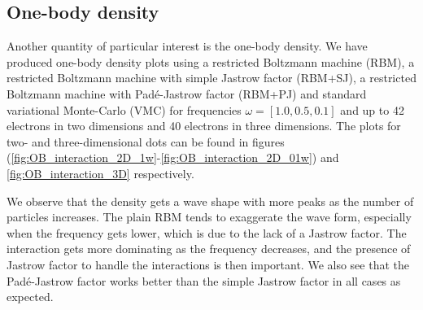 \subsection{One-body density}
Another quantity of particular interest is the one-body density. We have produced one-body density plots using a restricted Boltzmann machine (RBM), a restricted Boltzmann machine with simple Jastrow factor (RBM+SJ), a restricted Boltzmann machine with Padé-Jastrow factor (RBM+PJ) and standard variational Monte-Carlo (VMC) for frequencies $\omega=[1.0,0.5,0.1]$ and up to 42 electrons in two dimensions and 40 electrons in three dimensions. The plots for two- and three-dimensional dots can be found in figures (\ref{fig:OB_interaction_2D_1w}-\ref{fig:OB_interaction_2D_01w}) and \ref{fig:OB_interaction_3D} respectively.

We observe that the density gets a wave shape with more peaks as the number of particles increases. The plain RBM tends to exaggerate the wave form, especially when the frequency gets lower, which is due to the lack of a Jastrow factor. The interaction gets more dominating as the frequency decreases, and the presence of Jastrow factor to handle the interactions is then important. We also see that the Padé-Jastrow factor works better than the simple Jastrow factor in all cases as expected.

